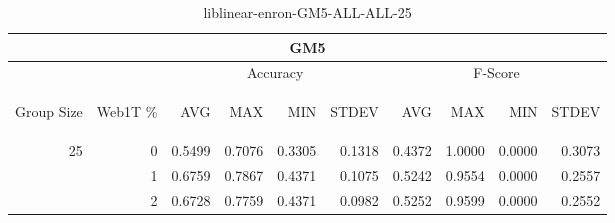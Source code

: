 \begin{center}
\begin{table}[htbp]
\begin{tabular}{ | r | r | r | r | r | r | r | r | r | r |}
\hline
\multicolumn{10}{|c|}{GM5}\\
\hline
 & & \multicolumn{4}{|c|}{Accuracy} & \multicolumn{4}{|c|}{F-Score}\\ \cline{3-10}
\begin{sideways}Group Size\end{sideways} & \begin{sideways}Web1T \%\end{sideways} & \begin{sideways}AVG\end{sideways} & \begin{sideways}MAX\end{sideways} & \begin{sideways}MIN\end{sideways} & \begin{sideways}STDEV\end{sideways} & \begin{sideways}AVG\end{sideways} & \begin{sideways}MAX\end{sideways} & \begin{sideways}MIN\end{sideways} & \begin{sideways}STDEV\end{sideways}\\
\hline
\multirow{2}{*}{25}
 & 0 & 0.5499 & 0.7076 & 0.3305 & 0.1318 & 0.4372 & 1.0000 & 0.0000 & 0.3073\\ \cline{2-10}
 & 1 & 0.6759 & 0.7867 & 0.4371 & 0.1075 & 0.5242 & 0.9554 & 0.0000 & 0.2557\\ \cline{2-10}
 & 2 & 0.6728 & 0.7759 & 0.4371 & 0.0982 & 0.5252 & 0.9599 & 0.0000 & 0.2552\\ \cline{2-10}
\hline
\end{tabular}
\caption{liblinear-enron-GM5-ALL-ALL-25}
\label{table:liblinear-enron-GM5-ALL-ALL-25}
\end{table}
\end{center}

